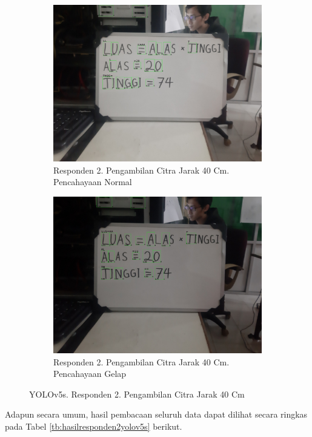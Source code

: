 \begin{figure}[H]
  \begin{subfigure}{.5\textwidth}
    \centering
    \captionsetup{width=.8\linewidth}
    \includegraphics[width=.8\linewidth]{gambar/yolov5s/responden2/ghiyas40cm00-result.jpg}
    \caption{Responden 2. Pengambilan Citra Jarak 40 Cm. Pencahayaan Normal}
    \label{fig:sr2tcitra40cm}
  \end{subfigure}%
  \begin{subfigure}{.5\textwidth}
    \centering
    \captionsetup{width=.8\linewidth}
    \includegraphics[width=.8\linewidth]{gambar/yolov5s/responden2/ghiyas40cm10-result.jpg}
    \caption{Responden 2. Pengambilan Citra Jarak 40 Cm. Pencahayaan Gelap}
    \label{fig:sr2gcitra40cm}
  \end{subfigure}
  \caption{YOLOv5s. Responden 2. Pengambilan Citra Jarak 40 Cm}
  \label{fig:sr2citra40cm}
\end{figure}

Adapun secara umum, hasil pembacaan seluruh data dapat dilihat secara ringkas pada Tabel \ref*{tb:hasilresponden2yolov5s} berikut.

